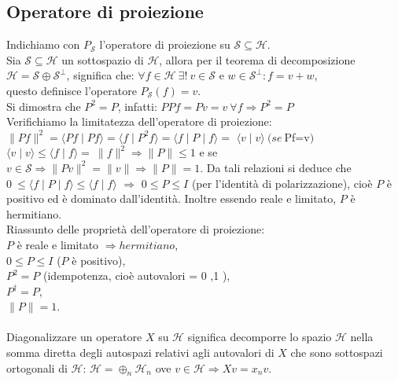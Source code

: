\subsection{Operatore di proiezione} %
Indichiamo con $P_{\mathcal{S}}$ l'operatore di proiezione su $\mathcal{S} \subseteq \mathcal{H}$.\\
Sia $\mathcal{S} \subseteq \mathcal{H}$ un sottospazio di $\mathcal{H}$, allora per il teorema di decomposizione $\mathcal{H} = \mathcal{S} \oplus \mathcal{S^{\perp}}$, significa che: $\forall f \in \mathcal{H} \ \exists ! \ v \in \mathcal{S}$ e $w \in \mathcal{S^{\perp}} : f=v+w$, \\ questo definisce l'operatore $P_{\mathcal{S}}(f)=v$.\\
Si dimostra che $P^{2}=P$, infatti: $P P f = P v = v \ \forall f \Rightarrow P^2=P$ \\
Verifichiamo la limitatezza dell'operatore di proiezione:\\ $\parallel Pf \parallel ^{2} = \langle Pf \mid Pf \rangle = \langle f \mid P^{2}f \rangle = \langle f \mid P \mid f \rangle = $ $\langle v \mid v \rangle \ (se \ $Pf=v$) $ \\ $\langle v \mid v \rangle \leq \langle f \mid f \rangle = \ \parallel f \parallel ^{2} \Rightarrow \parallel P \parallel \leq 1$ e se $v \in \mathcal{S} \Rightarrow \parallel Pv \parallel ^{2} = \parallel v \parallel \Rightarrow \parallel P \parallel =1$. Da tali relazioni si deduce che $0 \ \leq \langle f \mid P \mid f \rangle \leq \langle f \mid f \rangle$ $\Rightarrow$ $0 \leq P \leq I$ (per l'identità di polarizzazione), cioè $P$ è positivo ed è dominato dall'identità. Inoltre essendo reale e limitato, $P$ è hermitiano. \\
Riassunto delle proprietà dell'operatore di proiezione: \\$P$ è reale e limitato $\Rightarrow hermitiano$, \\ $0 \leq P \leq I$ ($P$ è positivo),\\ $P^{2}=P$ (idempotenza, cioè autovalori = 0 ,1  ), \\ $P^{\dag}=P$, \\ $\parallel P \parallel =1$.\\ \\
Diagonalizzare un operatore $X$ su $\mathcal{H}$ significa decomporre lo spazio $\mathcal{H}$ nella somma diretta degli autospazi relativi agli autovalori di $X$ che sono sottospazi ortogonali di $\mathcal{H}$: $\mathcal{H} = \oplus_{n}\mathcal{H}_{n}$ ove $v \in \mathcal{H} \Rightarrow Xv=x_{n}v$.\\ 
